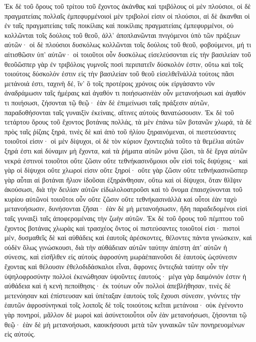 Ἐκ δὲ τοῦ ὄρους τοῦ τρίτου τοῦ ἔχοντος ἀκάνθας καὶ τριβόλους οἱ μὲν πλούσιοι, οἱ δὲ πραγματείαις πολλαῖς ἐμπεφυρμένοιοἱ μὲν τριβολοί εἰσιν οἱ πλούσιοι, αἱ δὲ ἄκανθαι οἱ ἐν ταῖς πραγματείαις ταῖς ποικίλαις καὶ ποικίλαις πραγματείαις ἐμπεφυρμένοι, οὐ κολλῶνται τοῖς δούλοις τοῦ θεοῦ, ἀλλ’ ἀποπλανῶνται πνιγόμενοι ὑπὸ τῶν πράξεων αὐτῶν· οἱ δὲ πλούσιοι δυσκόλως κολλῶνται τοῖς δούλοις τοῦ θεοῦ, φοβούμενοι, μή τι αἰτισθῶσιν ὑπ’ αὐτῶν· οἱ τοιοῦτοι οὖν δυσκόλως εἰσελεύσονται εἰς τὴν βασιλείαν τοῦ θεοῦὥσπερ γὰρ ἐν τριβόλοις γυμνοῖς ποσὶ περιπατεῖν δύσκολόν ἐστιν, οὕτω καὶ τοῖς τοιούτοις δύσκολόν ἐστιν εἰς τὴν βασιλείαν τοῦ θεοῦ εἰσελθεῖνἀλλὰ τούτοις πᾶσι μετάνοιά ἐστι, ταχινὴ δέ, ἵν’ ὃ τοῖς προτέροις χρόνοις οὐκ εἰργάσαντο νῦν ἀναδράμωσιν ταῖς ἡμέραις καὶ ἀγαθόν τι ποιήσωσινἐὰν οὖν μετανοήσωσι καὶ ἀγαθόν τι ποιήσωσι, ζήσονται τῷ θεῷ· ἐὰν δὲ ἐπιμείνωσι ταῖς πράξεσιν αὐτῶν, παραδοθήσονται ταῖς γυναιξὶν ἐκείναις, αἵτινες αὐτοὺς θανατώσουσιν.
Ἐκ δὲ τοῦ τετάρτου ὄρους τοῦ ἔχοντος βοτάνας πολλάς, τὰ μὲν ἐπάνω τῶν βοτανῶν χλωρά, τὰ δὲ πρὸς ταῖς ῥίζαις ξηρά, τινὲς δὲ καὶ ἀπὸ τοῦ ἡλίου ξηραινόμεναι, οἱ πιεστεύσαντες τοιοῦτοί εἰσιν· οἱ μὲν δίψυχοι, οἱ δὲ τὸν κύριον ἔχοντεςδιὰ τοῦτο τὰ θεμέλια αὐτῶν ξηρά ἐστι καὶ δύναμιν μὴ ἔχοντα, καὶ τὰ ῥήματα αὐτῶν μόνα ζῶσι, τὰ δὲ ἔργα αὐτῶν νεκρά ἐστινοἱ τοιοῦτοι οὔτε ζῶσιν οὔτε τεθνήκασινὅμοιοι οὖν εἰσὶ τοῖς διψύχοις· καὶ γὰρ οἱ δίψυχοι οὔτε χλωροί εἰσιν οὔτε ξηροί· οὔτε γὰρ ζῶσιν οὔτε τεθνήκασινὥσπερ γὰρ αὗται αἱ βοτάναι ἥλιον ἰδοῦσαι ἐξηράνθησαν, οὕτω καὶ οἱ δίψυχοι, ὅταν θλῖψιν ἀκούσωσι, διὰ τὴν δειλίαν αὐτῶν εἰδωλολοατροῦσι καὶ τὸ ὄνομα ἐπαισχύνονται τοῦ κυρίου αὐτῶνοἱ τοιοῦτοι οὖν οὔτε ζῶσιν οὔτε τεθνήκασινἀλλὰ καὶ οὗτοι ἐὰν ταχὺ μετανοήσωσιν, δυνήσονται ζῆσαι· ἐὰν δὲ μὴ μετανοήσωσιν, ἤδη παραδεδομένοι εἰσὶ ταῖς γυναιξὶ ταῖς ἀποφερομέναις τὴν ζωὴν αὐτῶν.
Ἐκ δὲ τοῦ ὄρους τοῦ πέμπτου τοῦ ἔχοντος βοτάνας χλωρὰς καὶ τρασχέος ὄντος οἱ πιστεύσαντες τοιοῦτοί εἰσι· πιστοὶ μέν, δυσμαθεῖς δὲ καὶ αὐθάδεις καὶ ἑαυτοῖς ἀρέσκοντες, θέλοντες πάντα γινώσκειν, καὶ οὐδὲν ὅλως γινώσκουσι, διὰ τὴν αὐθάδειαν αὐτῶν ταύτην ἀπέστη ἀπ’ αὐτῶν ἡ σύνεσις, καὶ εἰσῆλθεν εἰς αὐτοὺς ἀφροσύνη μωράἐπαινοῦσι δὲ ἑαυτοὺς ὡςσύνεσιν ἔχοντας καὶ θέλουσιν ἐθελοδιδάσκαλοι εἶναι, ἄφρονες ὄντεςδιὰ ταύτην οὖν τὴν ὑψηλοφροσύνην πολλοὶ ἐκενώθησαν ὑψοῦντες ἑαυτούς· μέγα γὰρ δαιμόνιόν ἐστιν ἡ αὐθάδεια καὶ ἡ κενὴ πεποίθησις· ἐκ τούτων οὖν πολλοὶ ἀπεβλήθησαν, τινὲς δὲ μετενόησαν καὶ ἐπίστευσαν καὶ ὑπέταξαν ἑαυτοὺς τοῖς ἔχουσι σύνεσιν, γνόντες τὴν ἑαυτῶν ἀφροσύνηνκαὶ τοῖς λοιποῖς δὲ τοῖς τοιούτοις κεῖται μετάνοια· οὐκ ἐγένοντο γὰρ πονηροί, μᾶλλον δὲ μωροὶ καὶ ἀσύνετοιοὗτοι οὖν ἐὰν μετανοήσωσι, ζήσονται τῷ θεῷ· ἐὰν δὲ μὴ μετανοήσωσι, καοικήσουσι μετὰ τῶν γυναικῶν τῶν πονηρευομένων εἰς αὐτούς.
